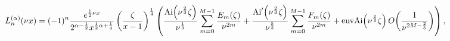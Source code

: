 \[\mathop{L^{(\alpha)}_{n}\/}\nolimits\!\left(\nu x\right)=(-1)^{n}\frac{e^{%
\frac{1}{2}\nu x}}{2^{\alpha-\frac{1}{2}}x^{\frac{1}{2}\alpha+\frac{1}{4}}}\*%
\left(\frac{\zeta}{x-1}\right)^{\frac{1}{4}}\left(\frac{\mathop{\mathrm{Ai}\/}%
\nolimits\!\left(\nu^{\frac{2}{3}}\zeta\right)}{\nu^{\frac{1}{3}}}\sum_{m=0}^{%
M-1}\frac{E_{m}(\zeta)}{\nu^{2m}}+\frac{\mathop{\mathrm{Ai}\/}\nolimits'\!%
\left(\nu^{\frac{2}{3}}\zeta\right)}{\nu^{\frac{5}{3}}}\sum_{m=0}^{M-1}\frac{F%
_{m}(\zeta)}{\nu^{2m}}+\mathop{\mathrm{envAi}\/}\nolimits\!\left(\nu^{\frac{2}%
{3}}\zeta\right)\mathop{O\/}\nolimits\!\left(\frac{1}{\nu^{2M-\frac{2}{3}}}%
\right)\right),\]